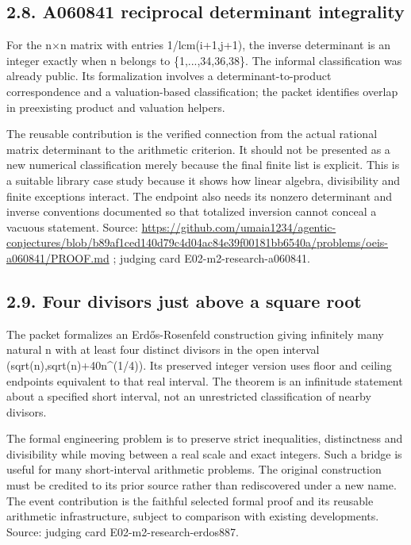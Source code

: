 \documentclass[11pt,a4paper]{article}
\begin{document}
\subsection{2.8. A060841 reciprocal determinant integrality}
For the n\ensuremath{\times}n matrix with entries 1/lcm(i+1,j+1), the inverse determinant is an integer exactly when n belongs to \{1,...,34,36,38\}. The informal classification was already public. Its formalization involves a determinant-to-product correspondence and a valuation-based classification; the packet identifies overlap in preexisting product and valuation helpers.

The reusable contribution is the verified connection from the actual rational matrix determinant to the arithmetic criterion. It should not be presented as a new numerical classification merely because the final finite list is explicit. This is a suitable library case study because it shows how linear algebra, divisibility and finite exceptions interact. The endpoint also needs its nonzero determinant and inverse conventions documented so that totalized inversion cannot conceal a vacuous statement. Source: \url{https://github.com/umaia1234/agentic-conjectures/blob/b89af1ced140d79c4d04ac84e39f00181bb6540a/problems/oeis-a060841/PROOF.md} ; judging card E02-m2-research-a060841.

\subsection{2.9. Four divisors just above a square root}
The packet formalizes an Erdős-Rosenfeld construction giving infinitely many natural n with at least four distinct divisors in the open interval (sqrt(n),sqrt(n)+40n\textasciicircum{}(1/4)). Its preserved integer version uses floor and ceiling endpoints equivalent to that real interval. The theorem is an infinitude statement about a specified short interval, not an unrestricted classification of nearby divisors.

The formal engineering problem is to preserve strict inequalities, distinctness and divisibility while moving between a real scale and exact integers. Such a bridge is useful for many short-interval arithmetic problems. The original construction must be credited to its prior source rather than rediscovered under a new name. The event contribution is the faithful selected formal proof and its reusable arithmetic infrastructure, subject to comparison with existing developments. Source: judging card E02-m2-research-erdos887.
\end{document}
